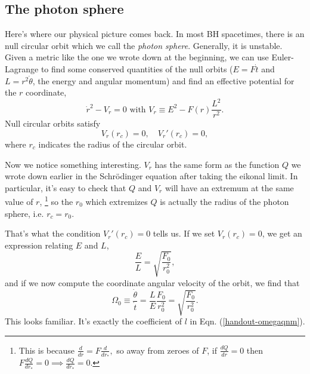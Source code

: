 \documentclass{tufte-handout}
\newcommand{\?}{\overset{?}{=}}
\newcommand{\term}{\emph}
\theoremstyle{definition}
\theoremstyle{remark}
\begin{document}
\subsection{The photon sphere}
Here's where our physical picture comes back. In most BH spacetimes, there is an null circular orbit which we call the \term{photon sphere}. Generally, it is unstable. Given a metric like the one we wrote down at the beginning, we can use Euler-Lagrange to find some conserved quantities of the null orbits ($E=F \dot t$ and $L=r^2 \dot \theta$, the energy and angular momentum) and find an effective potential for the $r$ coordinate,
\begin{equation}
    \dot r^2 - V_r = 0 \text{ with } V_r \equiv E^2 -F(r)\frac{L^2}{r^2}.
\end{equation}
Null circular orbits satisfy
\begin{equation*}
    V_r(r_c) = 0, \quad V_r'(r_c) = 0,
\end{equation*}
where $r_c$ indicates the radius of the circular orbit.

Now we notice something interesting. $V_r$ has the same form as the function $Q$ we wrote down earlier in the Schr\"odinger equation after taking the eikonal limit. In particular, it's easy to check that $Q$ and $V_r$ will have an extremum at the same value of $r$,%
    \footnote{This is because $\frac{d}{dr}=F \frac{d}{dr_*},$ so away from zeroes of $F$, if $\frac{dQ}{dr}=0$ then $F\frac{dQ}{dr_*}=0\implies \frac{dQ}{dr_*}=0$.}
so the $r_0$ which extremizes $Q$ is actually the radius of the photon sphere, i.e. $r_c=r_0$.

That's what the condition $V_r'(r_c)=0$ tells us. If we set $V_r(r_c)=0$, we get an expression relating $E$ and $L$,
\begin{equation*}
    \frac{E}{L}=\sqrt{\frac{F_0}{r_0^2}},
\end{equation*}
and if we now compute the coordinate angular velocity of the orbit, we find that
\begin{equation*}
    \Omega_0 \equiv \frac{\dot \theta}{\dot t} = \frac{L}{E} \frac{F_0}{r_0^2} =\sqrt{\frac{F_0}{r_0^2}}.
\end{equation*}
This looks familiar. It's exactly the coefficient of $l$ in Eqn. (\ref{handout-omegaqnm}). 
\end{document}
